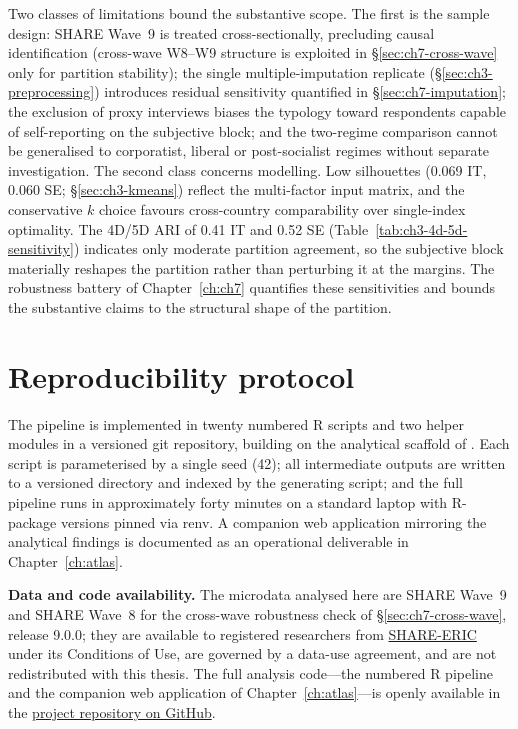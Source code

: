 Two classes of limitations bound the substantive scope. The first is the sample design: SHARE Wave~9 is treated cross-sectionally, precluding causal identification (cross-wave W8--W9 structure is exploited in \S\ref{sec:ch7-cross-wave} only for partition stability); the single multiple-imputation replicate (\S\ref{sec:ch3-preprocessing}) introduces residual sensitivity quantified in \S\ref{sec:ch7-imputation}; the exclusion of proxy interviews biases the typology toward respondents capable of self-reporting on the subjective block; and the two-regime comparison cannot be generalised to corporatist, liberal or post-socialist regimes without separate investigation. The second class concerns modelling. Low silhouettes (0.069 IT, 0.060 SE; \S\ref{sec:ch3-kmeans}) reflect the multi-factor input matrix, and the conservative $k$ choice favours cross-country comparability over single-index optimality. The 4D/5D ARI of 0.41 IT and 0.52 SE (Table~\ref{tab:ch3-4d-5d-sensitivity}) indicates only moderate partition agreement, so the subjective block materially reshapes the partition rather than perturbing it at the margins. The robustness battery of Chapter~\ref{ch:ch7} quantifies these sensitivities and bounds the substantive claims to the structural shape of the partition.

\section{Reproducibility protocol}
\label{sec:ch3-reproducibility}

The pipeline is implemented in twenty numbered R scripts and two helper modules in a versioned git repository, building on the analytical scaffold of \citet{piccarreta2025}. Each script is parameterised by a single seed (42); all intermediate outputs are written to a versioned directory and indexed by the generating script; and the full pipeline runs in approximately forty minutes on a standard laptop with R-package versions pinned via renv. A companion web application mirroring the analytical findings is documented as an operational deliverable in Chapter~\ref{ch:atlas}.

\textbf{Data and code availability.} The microdata analysed here are SHARE Wave~9 \citep{share_w9_2024} and SHARE Wave~8 \citep{share_w8_2024} for the cross-wave robustness check of \S\ref{sec:ch7-cross-wave}, release 9.0.0; they are available to registered researchers from \href{https://share-eric.eu/data}{SHARE-ERIC} under its Conditions of Use, are governed by a data-use agreement, and are not redistributed with this thesis. The full analysis code---the numbered R pipeline and the companion web application of Chapter~\ref{ch:atlas}---is openly available in the \href{https://github.com/Vincenzosos/invisible-profiles}{project repository on GitHub}.
